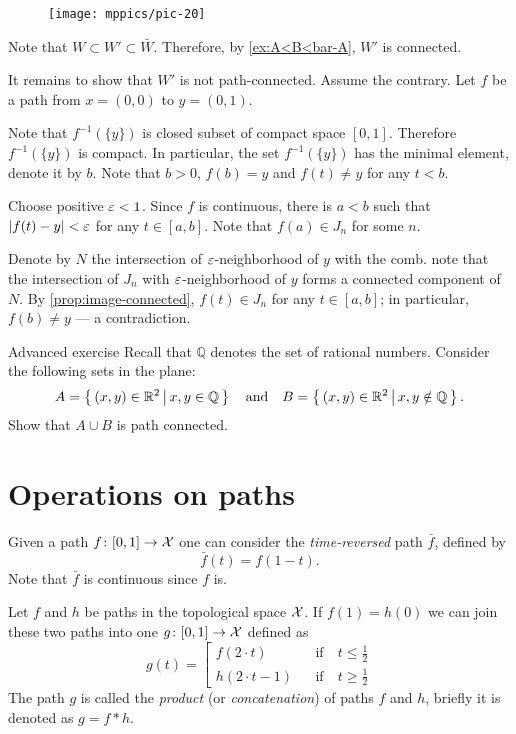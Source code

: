 \begin{wrapfigure}{r}{33mm}
\vskip-4mm
\texttt{[image: mppics/pic-20]}
\end{wrapfigure}

Note that $W\subset W'\subset \bar W$.
Therefore, by \ref{ex:A<B<bar-A}, $W'$ is connected.

It remains to show that $W'$ is not path-connected.
Assume the contrary. 
Let $f$ be a path from $x=(0,0)$ to $y=(0,1)$.

Note that $f^{-1}(\{y\})$ is closed subset of compact space $[0,1]$.
Therefore $f^{-1}(\{y\})$ is compact.
In particular, the set $f^{-1}(\{y\})$ has the minimal element,
denote it by $b$.
Note that $b>0$, $f(b)=y$ and $f(t)\ne y$ for any $t<b$.

Choose positive $\varepsilon<1$.
Since $f$ is continuous, there is $a<b$ such that $|f(t)-y|<\varepsilon$ for any $t\in [a,b]$.
Note that $f(a)\in J_n$ for some $n$.

Denote by $N$ the intersection of $\varepsilon$-neighborhood of $y$ with the comb.
note that the intersection of $J_n$ with $\varepsilon$-neighborhood of $y$ forms a connected component of $N$.
By \ref{prop:image-connected}, $f(t)\in J_n$ for any $t\in [a,b]$;
in particular, $f(b)\ne y$ --- a contradiction.
\qeds

\begin{thm}{Advanced exercise}\label{ex:QQ}
Recall that $\mathbb{Q}$ denotes the set of rational numbers.
Consider the following sets in the plane:
\[A=\left\{\,{(x,y)\in\mathbb{R}^2}\,\middle|\,{ x,y\in\mathbb{Q}}\,\right\}
\quad\text{and}\quad
B=\left\{\,{(x,y)\in\mathbb{R}^2}\,\middle|\,{x,y\notin\mathbb{Q}}\,\right\}.\]
Show that $A\cup B$ is path connected.
\end{thm}


\section{Operations on paths}\label{sec:Operations on paths}

Given a path $f\colon[0,1]\to \mathcal{X}$ one can consider the \emph{time-reversed} path $\bar f$, defined by
\[\bar f(t)=f(1-t).\]
Note that $\bar f$ is continuous since $f$ is.

Let $f$ and $h$ be paths in the topological space $\mathcal{X}$.
If $f(1)=h(0)$ we can join these two paths into one $g\colon[0,1]\to \mathcal{X}$ defined as 
\[g(t)=
\left[
\begin{aligned}
f(2\cdot t)&&\text{if}&\ t\le \tfrac12
\\
h(2\cdot t-1)&&\text{if}&\ t\ge \tfrac12
\end{aligned}
\right.
\]
The path $g$ is called the \emph{product} (or \emph{concatenation}) of paths $f$ and $h$, briefly it is denoted as $g=f * h$.

